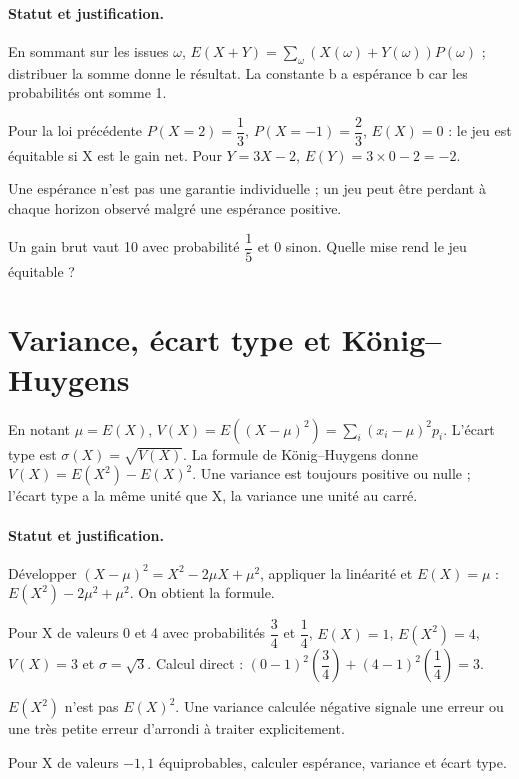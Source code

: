 \paragraph{Statut et justification.} En sommant sur les issues $\omega$, $E(X+Y)=\sum_\omega(X(\omega)+Y(\omega))P(\omega)$ ; distribuer la somme donne le résultat. La constante b a espérance b car les probabilités ont somme 1.
\begin{example}Pour la loi précédente $P(X=2)=\dfrac{1}{3}$, $P(X=-1)=\dfrac{2}{3}$, $E(X)=0$ : le jeu est équitable si X est le gain net. Pour $Y=3X-2$, $E(Y)=3\times0-2=-2$.\end{example}\label{C08-EX2}
\begin{pitfall}Une espérance n’est pas une garantie individuelle ; un jeu peut être perdant à chaque horizon observé malgré une espérance positive.\end{pitfall}
\begin{application}Un gain brut vaut 10 avec probabilité $\dfrac{1}{5}$ et 0 sinon. Quelle mise rend le jeu équitable ?\end{application}\label{C08-AP2}
\section{Variance, écart type et König–Huygens}\label{C08-U3}
\begin{keypoint}
En notant $\mu=E(X)$, $V(X)=E((X-\mu)^2)=\sum_i(x_i-\mu)^2p_i$. L’écart type est $\sigma(X)=\sqrt{V(X)}$. La formule de König–Huygens donne $V(X)=E(X^2)-E(X)^2$. Une variance est toujours positive ou nulle ; l’écart type a la même unité que X, la variance une unité au carré.
\end{keypoint}
\paragraph{Statut et justification.} Développer $(X-\mu)^2=X^2-2\mu X+\mu^2$, appliquer la linéarité et $E(X)=\mu$ : $E(X^2)-2\mu^2+\mu^2$. On obtient la formule.
\begin{example}Pour X de valeurs 0 et 4 avec probabilités $\dfrac{3}{4}$ et $\dfrac{1}{4}$, $E(X)=1$, $E(X^2)=4$, $V(X)=3$ et $\sigma=\sqrt3$. Calcul direct : $(0-1)^2(\dfrac{3}{4})+(4-1)^2(\dfrac{1}{4})=3$.\end{example}\label{C08-EX3}
\begin{pitfall}$E(X^2)$ n’est pas $E(X)^2$. Une variance calculée négative signale une erreur ou une très petite erreur d’arrondi à traiter explicitement.\end{pitfall}
\begin{application}Pour X de valeurs $-1,1$ équiprobables, calculer espérance, variance et écart type.\end{application}\label{C08-AP3}
